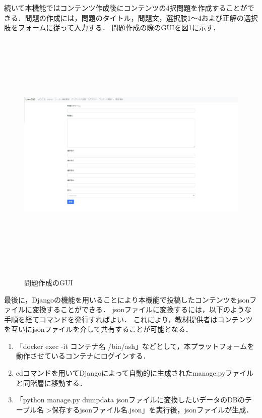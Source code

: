 \newpage
続いて本機能ではコンテンツ作成後にコンテンツの4択問題を作成することができる．問題の作成には，問題のタイトル，問題文，選択肢1～4および正解の選択肢をフォームに従って入力する．
問題作成の際のGUIを図\ref{create_question}に示す．

\begin{figure}[htbp]
    \begin{center}
        \includegraphics[width=13cm,height=12cm,keepaspectratio]{create_question-crop.pdf}\\
    \end{center}
    \caption{問題作成のGUI}
    \label{create_question}
\end{figure}

最後に，Djangoの機能を用いることにより本機能で投稿したコンテンツをjsonファイルに変換することができる．
jsonファイルに変換するには，以下のような手順を経てコマンドを発行すればよい．
これにより，教材提供者はコンテンツを互いにjsonファイルを介して共有することが可能となる．

\begin{enumerate}
    \item 「docker exec -it コンテナ名 /bin/ash」などとして，本プラットフォームを動作させているコンテナにログインする．
    \item cdコマンドを用いてDjangoによって自動的に生成されたmanage.pyファイルと同階層に移動する．
    \item 「python manage.py dumpdata jsonファイルに変換したいデータのDBのテーブル名 \textgreater 保存するjsonファイル名.json」を実行後，jsonファイルが生成．
\end{enumerate}